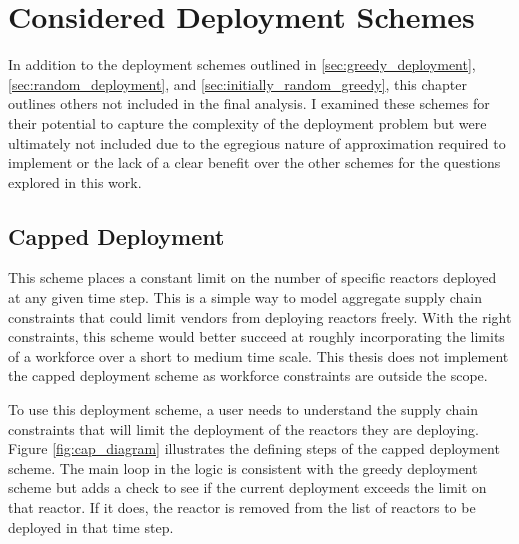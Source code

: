 \chapter{Considered Deployment Schemes}
\label{sec:considered_deployment_schemes}
In addition to the deployment schemes outlined in \ref{sec:greedy_deployment},
\ref{sec:random_deployment}, and \ref{sec:initially_random_greedy}, this chapter outlines others not included in the final analysis. I examined these schemes for their potential to capture the complexity of the deployment problem but were ultimately not included due to the egregious nature of approximation required to implement or the lack of a clear benefit over the other schemes for the questions explored in this work.

\section{Capped Deployment}
\label{sec:capped_deployment}
This scheme places a constant limit on the number of specific reactors deployed
at any given time step. This is a simple way to model aggregate supply chain
constraints that could limit vendors from deploying reactors freely. With the
right constraints, this scheme would better succeed at roughly incorporating
the limits of a workforce over a short to medium time scale. This thesis does not implement the capped deployment scheme as workforce constraints are outside the scope.

To use this deployment scheme, a user needs to understand the supply chain constraints that will limit the deployment of the reactors they are deploying. Figure \ref{fig:cap_diagram} illustrates the defining steps of the capped deployment scheme. The main loop in the logic is consistent with the greedy deployment scheme but adds a check to see if the current deployment exceeds the limit on that reactor. If it does, the reactor is removed from the list of reactors to be deployed in that time step.

